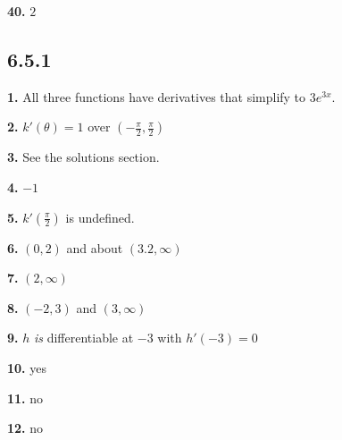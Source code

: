 \documentclass[12pt,]{book}
\theoremstyle{plain}
\theoremstyle{definition}
\numberwithin{equation}{section}
\newcommand{\fe}[2]{#1\mathopen{}\left(#2\right)\mathclose{}}
\newcommand{\ointerval}[2]{\left(#1,#2\right)}
\newcommand{\fd}[1]{#1'}
\begin{document}
                \par\smallskip
\noindent\textbf{40.}\quad{}
                    \(2\)%

                \par\smallskip
\subsection*{6.5.1 }
\noindent\textbf{1.}\quad{}
                All three functions have derivatives that simplify to \(3e^{3x}\).%

            \par\smallskip
\noindent\textbf{2.}\quad{}
                    \(\fe{\fd{k}}{\theta}=1\) over \(\ointerval{-\frac{\pi}{2}}{\frac{\pi}{2}}\)%

                \par\smallskip
\noindent\textbf{3.}\quad{}
                    See the solutions section.%

                \par\smallskip
\noindent\textbf{4.}\quad{}
                    \(-1\)%

                \par\smallskip
\noindent\textbf{5.}\quad{}
                    \(\fe{\fd{k}}{\frac{\pi}{2}}\) is undefined.%

                \par\smallskip
\noindent\textbf{6.}\quad{}
                    \(\ointerval{0}{2}\) and about \(\ointerval{3.2}{\infty}\)%

                \par\smallskip
\noindent\textbf{7.}\quad{}
                    \(\ointerval{2}{\infty}\)%

                \par\smallskip
\noindent\textbf{8.}\quad{}
                    \(\ointerval{-2}{3}\) and \(\ointerval{3}{\infty}\)%

                \par\smallskip
\noindent\textbf{9.}\quad{}
                    \(h\) \emph{is} differentiable at \(-3\) with \(\fe{\fd{h}}{-3}=0\)%

                \par\smallskip
\noindent\textbf{10.}\quad{}
                    yes%

                \par\smallskip
\noindent\textbf{11.}\quad{}
                    no%

                \par\smallskip
\noindent\textbf{12.}\quad{}
                    no%
\end{document}
